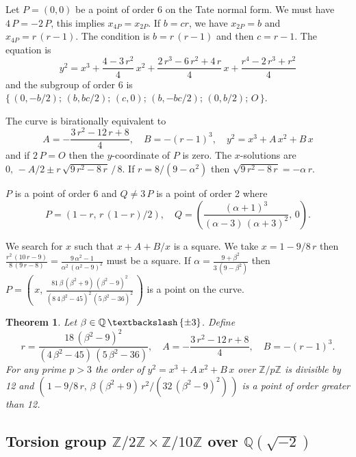 \documentclass[a4paper, 11pt, pdftex]{report}
\theoremstyle{plain}
\newtheorem{theorem}{Theorem}[chapter]
\theoremstyle{definition}
\begin{document}
Let $P = (0, 0)$ be a point of order 6 on the Tate normal form. We must have $4\,P = -2\,P$,
this implies $x_{4P} = x_{2P}$. If $b = cr$, we have $x_{2P} = b$ and $x_{4P} = r\,(r - 1)$.
The condition is $b = r\,(r - 1)$ and then $c = r - 1$. The equation is
$$y^2 = x^3 + \frac{4 - 3\,r^2}{4}\, x^2 + \frac{2\,r^3 - 6\,r^2 + 4\,r}{4}\, x
 + \frac{r^4 - 2\,r^3 + r^2}{4}$$
and the subgroup of order 6 is $\{\,(0, -b/2);\, (b, bc/2);\, (c, 0);\, (b, -bc/2);\, (0, b/2);\, O\, \}$.

The curve is birationally equivalent to
$$A = -\frac{3\,r^2 - 12\,r + 8}{4},\quad B = -(r-1)^3,\quad y^2 = x^3 + A\,x^2 + B\,x$$
and if $2\,P = O$ then the $y$-coordinate of $P$ is zero. The $x$-solutions are
$0,\, -A/2 \pm r\,\sqrt{9\,r^2 - 8\,r}\,/\,8$.
If $r = 8/(9 - \alpha^2)$ then $\sqrt{9\,r^2 - 8\,r} = -\alpha\,r$.

$P$ is a point of order 6 and $Q \neq 3\,P$ is a point of order 2 where
$$P = \left(1 - r,\, r\,(1 - r) / 2\right),\quad
  Q = \left(\frac{(\alpha + 1)^3}{(\alpha - 3)\,(\alpha + 3)^2},\, 0\right).$$
  
We search for $x$ such that $x + A + B / x$ is a square. We take $x = 1 - 9/8\,r$ then
$\frac{r^2\,(10\,r - 9)}{8\,(9\,r - 8)} = \frac{9\,\alpha^2 - 1}{\alpha^2\, (\alpha^2 - 9)^2}$
must be a square. If $\alpha = \frac{9 + \beta^2}{3\,(9 - \beta^2)}$ then
$P = \left(\,x,\, \frac{81\, \beta\, (\beta^2 + 9)\, (\beta^2 - 9)^2}{(8\, 4\,\beta^2 - 45)^2\, (5\,\beta^2 - 36)^2}\,\right)$ is a point on the curve.

\begin{theorem} \label{Th_2x6}
Let $\beta \in \mathbb{Q}\, \textbackslash \, \{\pm3\}$. Define
$$r = \frac{18\, (\beta^2 - 9)^2}{(4\, \beta^2 - 45)\, (5\,\beta^2 - 36)},\quad
A = -\frac{3\,r^2 - 12\,r + 8}{4},\quad B = -(r-1)^3.$$
For any prime $p > 3$ the order of $y^2 = x^3 + A\, x^2 + B\, x$
over $\mathbb{Z}/p\mathbb{Z}$ is divisible by 12 and $\left(\,1 - 9/8\,r,\,
\beta\, (\beta^2 + 9)\, r^2 / (32\, (\beta^2 - 9)^2)\,\right)$
is a point of order greater than 12.
\end{theorem}


\subsection{Torsion group $\mathbb{Z}/2\mathbb{Z} \times \mathbb{Z}/10\mathbb{Z}$ over $\mathbb{Q}(\sqrt{-2})$}
\end{document}
